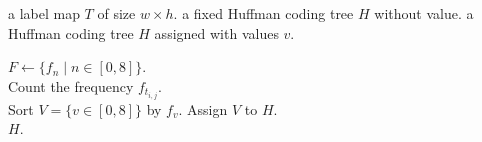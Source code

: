 \begin{algorithm}
	\caption{Assign values to Huffman coding rule}
	\label{alg:msb:assignhr}
	
	\begin{algorithmic}[1]
		\Require a label map $T$ of size $w \times h$.
		\Require a fixed Huffman coding tree $H$ without value.
		\Ensure a Huffman coding tree $H$ assigned with values $v$.
		
		 
			\State $F \gets \{f_n \mid n \in [0, 8]\}$.
			\\
			\ForAll{$\{t_{i, j} \in T \mid i \in [1, h), j \in [1, w)\}$}
				\State Count the frequency $f_{t_{i, j}}$.
			\EndFor
			\\
			\State Sort $V = \{v \in [0, 8]\}$ by $f_v$.
			\State Assign $V$ to $H$.
			\\
			\State \Return $H$.
		\EndFunction
	\end{algorithmic}
\end{algorithm}


